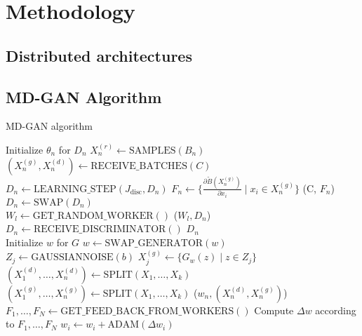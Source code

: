 \chapter{Methodology}
\label{chap:methodology}

\section{Distributed architectures}

\section{MD-GAN Algorithm}
\begin{algorithm}[ht]
    \caption{MD-GAN algorithm}
    \begin{algorithmic}[1]
        \State Initialize $\theta_n$ for $D_n$
            \State $X_n^{(r)} \gets \text{SAMPLES}(B_n)$
            \State $(X_n^{(g)}, X_n^{(d)}) \gets \text{RECEIVE\_BATCHES}(C)$
                \State $D_n \gets \text{LEARNING\_STEP}(J_{\text{disc}}, D_n)$
            \EndFor
            \State $F_n \gets \{\frac{\partial \tilde{B}(X_n^(g))}{\partial x_i} \mid x_i \in X_n^{(g)} \}$
            \State {}(C, $F_n$)
                \State $D_n \gets \text{SWAP}(D_n)$
            \EndIf
        \EndFor
    \EndProcedure
    \\
        \State $W_l \gets \text{GET\_RANDOM\_WORKER}()$
        \State {}($W_l, D_n$)
        \State $D_n \gets \text{RECEIVE\_DISCRIMINATOR}()$
        \State \Return $D_n$
    \EndProcedure
    \\
        \State Initialize $w$ for $G$
                \State $w \gets \text{SWAP\_GENERATOR}(w)$
            \EndIf
                \State $Z_j \gets \text{GAUSSIANNOISE}(b)$
                \State $X_j^{(g)} \gets \{G_w(z) \mid z \in Z_j\}$
            \EndFor
            \State $(X_1^{(d)}, \dots, X_n^{(d)}) \gets \text{SPLIT}(X_1, \dots, X_k)$
            \State $(X_1^{(g)}, \dots, X_n^{(g)}) \gets \text{SPLIT}(X_1, \dots, X_k)$
                \State {}($w_n, (X_n^{(d)}, X_n^{(g)})$)
            \EndFor
        \EndFor
        \State $F_1, \dots, F_N \gets \text{GET\_FEED\_BACK\_FROM\_WORKERS}()$
        \State Compute $\Delta w$ according to $F_1, \dots, F_N$
            \State $w_i \gets w_i + \text{ADAM}(\Delta w_i)$
        \EndFor
    \EndProcedure
    \end{algorithmic}
\end{algorithm}

